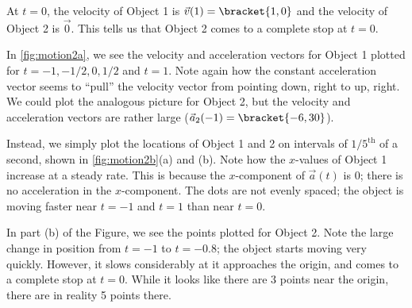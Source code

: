 \begin{example}
At $t=0$, the velocity of Object 1 is $\vec v(1) =\bracket{1,0}$ and the velocity of Object 2 is $\vec 0$. This tells us that Object 2 comes to a complete stop at $t=0$. 

In \autoref{fig:motion2a}, we see the velocity and acceleration vectors for Object 1 plotted for $t=-1, -1/2, 0, 1/2$ and $t=1$. Note again how the constant acceleration vector seems to ``pull'' the velocity vector from pointing down, right to up, right. We could plot the analogous picture for Object 2, but the velocity and acceleration vectors are rather large ($\vec a_2(-1) =\bracket{-6,30}$). 

Instead, we simply plot the locations of Object 1 and 2  on intervals of $1/5^{\text{th}}$ of a second, shown in \autoref{fig:motion2b}(a) and (b). Note how the $x$-values of Object 1 increase at a steady rate. This is because the $x$-component of $\vec a(t)$ is 0; there is no acceleration in the $x$-component. The dots are not evenly spaced; the object is moving faster near $t=-1$ and $t=1$ than near $t=0$.

In part (b) of the Figure, we see the points plotted for Object 2. Note the large change in position from $t=-1$ to $t=-0.8$; the object starts moving very quickly. However, it slows considerably at it approaches the origin, and comes to a complete stop at $t=0$. While it looks like there are 3 points near the origin, there are in reality 5 points there.


\end{example}
